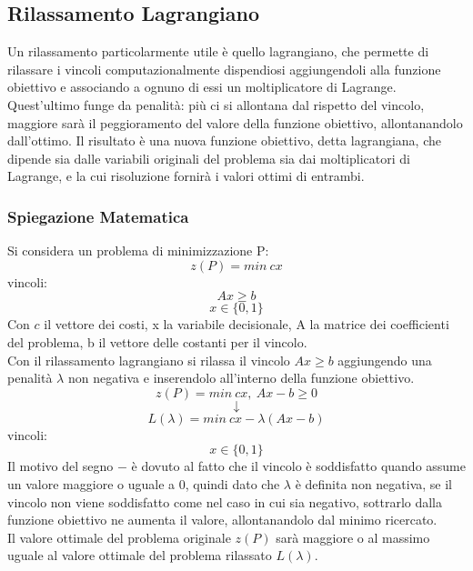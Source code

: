 \documentclass[12pt,a4paper,twoside]{report}
\begin{document}
	\subsection{Rilassamento Lagrangiano}
	Un rilassamento particolarmente utile è quello lagrangiano, che permette di rilassare i vincoli computazionalmente dispendiosi aggiungendoli alla funzione obiettivo e associando a ognuno di essi un moltiplicatore di Lagrange. Quest'ultimo funge da penalità: più ci si allontana dal rispetto del vincolo, maggiore sarà il peggioramento del valore della funzione obiettivo, allontanandolo dall'ottimo. Il risultato è una nuova funzione obiettivo, detta lagrangiana, che dipende sia dalle variabili originali del problema sia dai moltiplicatori di Lagrange, e la cui risoluzione fornirà i valori ottimi di entrambi.
	\subsubsection{Spiegazione Matematica}
	Si considera un problema di minimizzazione P:
	\begin{equation}
		z(P)=min\ cx 
	\end{equation}
	vincoli:
	\begin{equation}
		Ax \geq  b
	\end{equation}
	\begin{equation}
		x \in \{0, 1\}
	\end{equation}
	Con $c$ il vettore dei costi, x la variabile decisionale, A la matrice dei coefficienti del problema, b il vettore delle costanti per il vincolo. \smallskip \\
	Con il rilassamento lagrangiano si rilassa il vincolo $Ax \geq b$ aggiungendo una penalità $\lambda$ non negativa e inserendolo all'interno della funzione obiettivo.
	\begin{equation}
		z(P)=min\ cx,\ Ax-b \geq 0
	\end{equation}
	$$\downarrow$$
	\begin{equation}
		L(\lambda)=min\ cx-\lambda(Ax-b)
	\end{equation}
	vincoli:
	\begin{equation}
		x \in \{0, 1\}
	\end{equation}
	Il motivo del segno $-$ è dovuto al fatto che il vincolo è soddisfatto quando assume un valore maggiore o uguale a 0, quindi dato che $\lambda$ è definita non negativa, se il vincolo non viene soddisfatto come nel caso in cui sia negativo, sottrarlo dalla funzione obiettivo ne aumenta il valore, allontanandolo dal minimo ricercato.\vspace{0.15cm}  \\  Il valore ottimale del problema originale $z(P)$ sarà maggiore o al massimo uguale al valore ottimale del problema rilassato $L(\lambda)$. 
\end{document}
